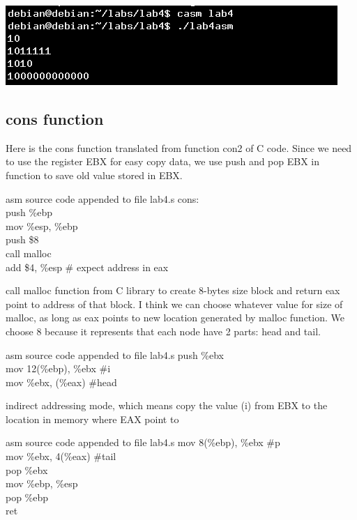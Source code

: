 \documentclass{article}
\begin{document}
\includegraphics{lab4asm.png} \\
\clearpage\subsection{cons function}
\begin{multicols}{2}
Here is the cons function translated from function con2 of C code. Since we need to use the register EBX for easy copy data, we use push and pop EBX in function to save old value stored in EBX.
\begin{GFT}{asm source code appended to file lab4.s}
\+cons:\\
\+  push \%ebp\\
\+  mov \%esp, \%ebp\\
\+  push \$8		\\
\+  call malloc\\
\+  add \$4, \%esp  	\# expect address in eax\\
\end{GFT}
call malloc function from C library to create 8-bytes size block and return eax point to address of that block. I think we can choose whatever value for size of malloc, as long as eax points to new location generated by malloc function. We choose 8 because it represents that each node have 2 parts: head and tail.
\columnbreak
\begin{GFT}{asm source code appended to file lab4.s}
\+  push \%ebx\\
\+  mov 12(\%ebp), \%ebx 	\#i\\
\+  mov \%ebx, (\%eax) 	\#head\\
\end{GFT}
indirect addressing mode, which means copy the value (i) from EBX to the location in memory where EAX point to
\begin{GFT}{asm source code appended to file lab4.s}
\+  mov 8(\%ebp), \%ebx 	\#p\\
\+  mov \%ebx, 4(\%eax) 	\#tail\\
\+  pop \%ebx\\
\+  mov \%ebp, \%esp\\
\+  pop \%ebp\\
\+  ret\\
\end{GFT}
\end{multicols}
\pagebreak
\end{document}
